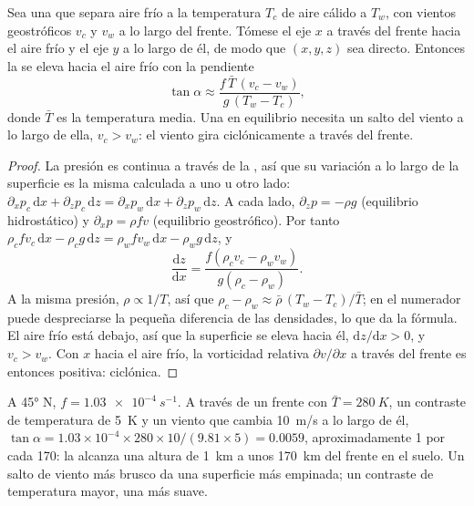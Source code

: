 \begin{proposition}\label{prop:b2:weather-systems:slope}
Sea una  que separa aire frío a la temperatura $T_c$ de aire cálido a $T_w$, con
vientos geostróficos $v_c$ y $v_w$ a lo largo del frente. Tómese el eje $x$ a través del frente hacia el
aire frío y el eje $y$ a lo largo de él, de modo que $(x, y, z)$ sea directo. Entonces la  se eleva hacia el aire frío con la pendiente
\[
  \tan\alpha \approx \frac{f\,\bar T\,(v_c - v_w)}{g\,(T_w - T_c)},
\]
donde $\bar T$ es la temperatura media. Una  en equilibrio necesita un salto del viento
a lo largo de ella, $v_c > v_w$: el viento gira ciclónicamente a través del frente.
\end{proposition}

\begin{proof}
La presión es continua a través de la , así que su variación a lo largo de la superficie es la
misma calculada a uno u otro lado: $\partial_x p_c\,\mathrm{d}x + \partial_z p_c\,\mathrm{d}z =
\partial_x p_w\,\mathrm{d}x + \partial_z p_w\,\mathrm{d}z$. A cada lado, $\partial_z p = -\rho g$
(equilibrio hidrostático) y $\partial_x p = \rho f v$ (equilibrio geostrófico). Por tanto
$\rho_c f v_c\,\mathrm{d}x - \rho_c g\,\mathrm{d}z = \rho_w f v_w\,\mathrm{d}x - \rho_w
g\,\mathrm{d}z$, y
\[
  \frac{\mathrm{d}z}{\mathrm{d}x} = \frac{f(\rho_c v_c - \rho_w v_w)}{g(\rho_c - \rho_w)} .
\]
A la misma presión, $\rho \propto 1/T$, así que $\rho_c - \rho_w \approx \bar\rho\,(T_w -
T_c)/\bar T$; en el numerador puede despreciarse la pequeña diferencia de las densidades, lo que
da la fórmula. El aire frío está debajo, así que la superficie se eleva hacia él, $\mathrm{d}z/
\mathrm{d}x > 0$, y $v_c > v_w$. Con $x$ hacia el aire frío, la vorticidad relativa
$\partial v/\partial x$ a través del frente es entonces positiva: ciclónica.
\end{proof}

\begin{example}\label{ex:b2:weather-systems:slope}
A \ang{45} N, $f = \qty{1.03e-4}{s^{-1}}$. A través de un frente con $\bar T = \qty{280}{K}$, un
contraste de temperatura de \qty{5}{K} y un viento que cambia \qty{10}{m/s} a lo largo de él, $\tan\alpha
= 1.03 \times 10^{-4} \times 280 \times 10/(9.81 \times 5) = 0.0059$, aproximadamente 1 por cada 170: la
 alcanza una altura de \qty{1}{km} a unos \qty{170}{km} del frente en el suelo.
Un salto de viento más brusco da una superficie más empinada; un contraste de temperatura mayor, una más suave.
\end{example}

